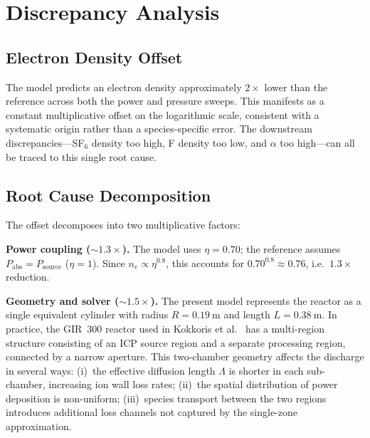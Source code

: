 \documentclass[11pt,a4paper]{report}
\begin{document}
\section{Discrepancy Analysis}
\label{sec:pure_discrepancy}

\subsection{Electron Density Offset}
\label{sec:pure_ne_offset}

The model predicts an electron density approximately $2\times$ lower than the reference across both the power and pressure sweeps.  This manifests as a constant multiplicative offset on the logarithmic scale, consistent with a systematic origin rather than a species-specific error.  The downstream discrepancies---SF$_6$ density too high, F density too low, and $\alpha$ too high---can all be traced to this single root cause.

\subsection{Root Cause Decomposition}
\label{sec:pure_rootcause}

The offset decomposes into two multiplicative factors:

\textbf{Power coupling (${\sim}1.3\times$).}  The model uses $\eta = 0.70$; the reference assumes $P_\text{abs} = P_\text{source}$ ($\eta = 1$).  Since $n_e \propto \eta^{0.8}$, this accounts for $0.70^{0.8} \approx 0.76$, i.e.\ $1.3\times$ reduction.

\textbf{Geometry and solver (${\sim}1.5\times$).}  The present model represents the reactor as a single equivalent cylinder with radius $R = \SI{0.19}{\meter}$ and length $L = \SI{0.38}{\meter}$.  In practice, the GIR~300 reactor used in Kokkoris et al.~\cite{Kokkoris2009} has a multi-region structure consisting of an ICP source region and a separate processing region, connected by a narrow aperture.  This two-chamber geometry affects the discharge in several ways: (i)~the effective diffusion length $\Lambda$ is shorter in each sub-chamber, increasing ion wall loss rates; (ii)~the spatial distribution of power deposition is non-uniform; (iii)~species transport between the two regions introduces additional loss channels not captured by the single-zone approximation.
\end{document}

